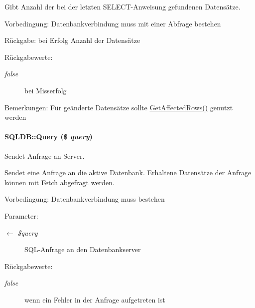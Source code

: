 Gibt Anzahl der bei der letzten SELECT-Anweisung gefundenen Datensätze. \begin{Desc}
\item[Vorbedingung:]Datenbankverbindung muss mit einer Abfrage bestehen \end{Desc}
\begin{Desc}
\item[R\"{u}ckgabe:]bei Erfolg Anzahl der Datensätze \end{Desc}
\begin{Desc}
\item[R\"{u}ckgabewerte:]
\begin{description}
\item[{\em false}]bei Misserfolg \end{description}
\end{Desc}
\begin{Desc}
\item[Bemerkungen:]Für geänderte Datensätze sollte \hyperlink{classSQLDB_8f3c28ae4ed5941c043459d6204a887b}{Get\-Affected\-Rows()} genutzt werden \end{Desc}
\hypertarget{classSQLDB_fc6ffa8df50f68f07d9f5e3385b96d7a}{
\paragraph[Query]{\setlength{\rightskip}{0pt plus 5cm}SQLDB::Query (\$ {\em query})}\hfill}
\label{classSQLDB_fc6ffa8df50f68f07d9f5e3385b96d7a}


Sendet Anfrage an Server. 

Sendet eine Anfrage an die aktive Datenbank. Erhaltene Datensätze der Anfrage können mit Fetch abgefragt werden. \begin{Desc}
\item[Vorbedingung:]Datenbankverbindung muss bestehen \end{Desc}
\begin{Desc}
\item[Parameter:]
\begin{description}
\item[\mbox{$\leftarrow$} {\em \$query}]SQL-Anfrage an den Datenbankserver \end{description}
\end{Desc}
\begin{Desc}
\item[R\"{u}ckgabewerte:]
\begin{description}
\item[{\em false}]wenn ein Fehler in der Anfrage aufgetreten ist \end{description}
\end{Desc}


